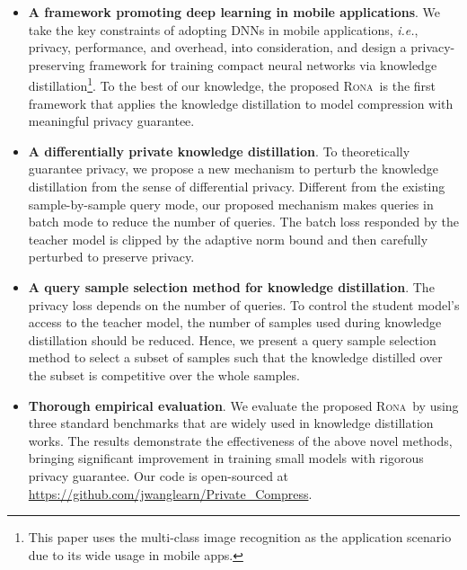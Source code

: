 \documentclass[letterpaper]{article} %
\newcommand*\system{\textsc{Rona}}
\begin{document}
\begin{itemize}[leftmargin=*,noitemsep,topsep=0pt]
\item \textbf{A framework promoting deep learning in mobile applications}. We take the key constraints of adopting DNNs in mobile applications, \textit{i.e.}, privacy, performance, and overhead, into consideration, and design a privacy-preserving framework for training compact neural networks via knowledge distillation\footnote{This paper uses the multi-class image recognition as the application scenario due to its wide usage in mobile apps.}. To the best of our knowledge, the proposed \system\ is the first framework that applies the knowledge distillation to model compression with meaningful privacy guarantee.
\item \textbf{A differentially private knowledge distillation}. To theoretically guarantee privacy, we propose a new mechanism to perturb the knowledge distillation from the sense of differential privacy. Different from the existing sample-by-sample query mode, our proposed mechanism makes queries in batch mode to reduce the number of queries. The batch loss responded by the teacher model is clipped by the adaptive norm bound and then carefully perturbed to preserve privacy.
\item \textbf{A query sample selection method for knowledge distillation}. The privacy loss depends on the number of queries. To control the student model's access to the teacher model, the number of samples used during knowledge distillation should be reduced. Hence, we present a query sample selection method to select a subset of samples such that the knowledge distilled over the subset is competitive over the whole samples.
\item \textbf{Thorough empirical evaluation}. We evaluate the proposed \system\ by using three standard benchmarks that are widely used in knowledge distillation works. The results demonstrate the effectiveness of the above novel methods, bringing significant improvement in training small models with rigorous privacy guarantee. Our code is open-sourced at \url{https://github.com/jwanglearn/Private_Compress}.
\end{itemize}
\end{document}
